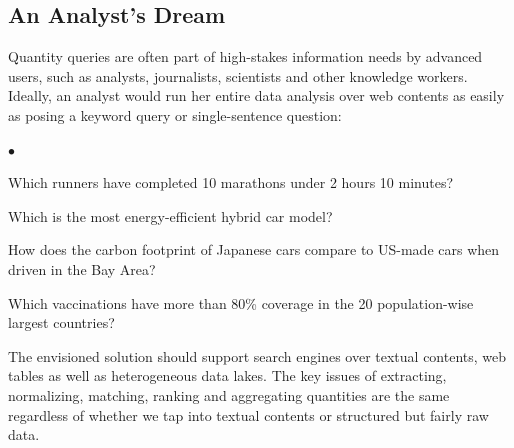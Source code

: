 \documentclass[11pt]{article}
\newcommand{\squishlist}{
 \begin{list}{$\bullet$}
  { \setlength{\itemsep}{0pt}
     \setlength{\parsep}{1pt}
     \setlength{\topsep}{1pt}
     \setlength{\partopsep}{0pt}
     \setlength{\leftmargin}{1.5em}
     \setlength{\labelwidth}{1em}
     \setlength{\labelsep}{0.5em} } }
\newcommand{\squishend}{\end{list}}
\begin{document}

\subsection*{An Analyst's Dream}


Quantity queries are often part of high-stakes information needs by
advanced users, such as analysts, journalists, scientists
and other knowledge workers.
Ideally, an analyst would run her entire 
data analysis over web contents as easily as posing a keyword query or
single-sentence question:
\squishlist
\item Which runners have completed 10 marathons under 2 hours 10 minutes?
\item Which is the most energy-efficient hybrid car model? 
\item How does the carbon footprint of Japanese cars compare to US-made cars
when driven in the Bay Area?
\item Which 
vaccinations have more than 80\% coverage in the 20 population-wise
largest countries?
\squishend
The envisioned solution should support search engines over textual contents,
web tables as well as heterogeneous data lakes.
The key issues of extracting, normalizing, matching, ranking and
aggregating quantities are the same regardless of whether we tap
into textual contents or structured but fairly raw data.
\end{document}
